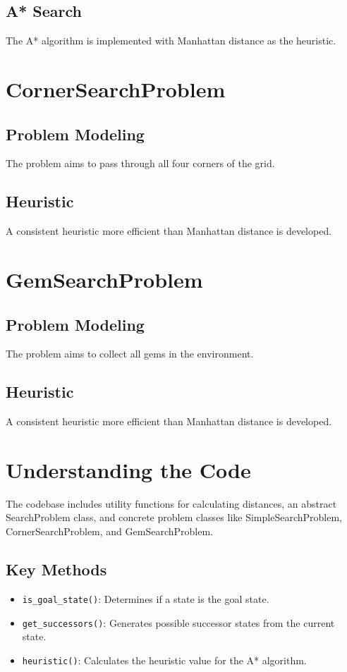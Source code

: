 \documentclass{article}
\begin{document}
\subsection{A* Search}
The A* algorithm is implemented with Manhattan distance as the heuristic.

\section{CornerSearchProblem}

\subsection{Problem Modeling}
The problem aims to pass through all four corners of the grid.

\subsection{Heuristic}
A consistent heuristic more efficient than Manhattan distance is developed.

\section{GemSearchProblem}

\subsection{Problem Modeling}
The problem aims to collect all gems in the environment.

\subsection{Heuristic}
A consistent heuristic more efficient than Manhattan distance is developed.


\section{Understanding the Code}

The codebase includes utility functions for calculating distances, an abstract SearchProblem class, and concrete problem classes like SimpleSearchProblem, CornerSearchProblem, and GemSearchProblem.

\subsection{Key Methods}
\begin{itemize}
    \item \texttt{is\_goal\_state()}: Determines if a state is the goal state.
    \item \texttt{get\_successors()}: Generates possible successor states from the current state.
    \item \texttt{heuristic()}: Calculates the heuristic value for the A* algorithm.
\end{itemize}
\end{document}
